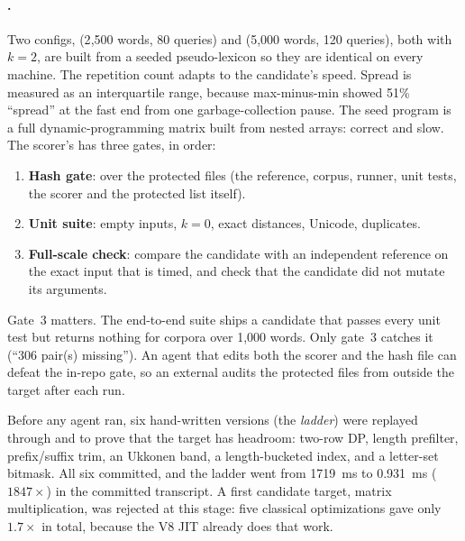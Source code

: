 \paragraph{.} Two configs,  (2{,}500 words, 80 queries) and
 (5{,}000 words, 120 queries), both with $k = 2$, are built from a seeded pseudo-lexicon
so they are identical on every machine. The repetition count adapts to the candidate's speed. Spread
is measured as an interquartile range, because max-minus-min showed 51\% ``spread'' at the fast end
from one garbage-collection pause. The seed program is a full dynamic-programming matrix built from
nested arrays: correct and slow. The scorer's  has three gates, in order:
\begin{enumerate}[leftmargin=*,itemsep=1pt]
  \item \textbf{Hash gate}:  over the protected files (the reference, corpus,
    runner, unit tests, the scorer and the protected list itself).
  \item \textbf{Unit suite}: empty inputs, $k=0$, exact distances, Unicode, duplicates.
  \item \textbf{Full-scale check}: compare the candidate with an independent reference on the
    exact input that is timed, and check that the candidate did not mutate its arguments.
\end{enumerate}
Gate~3 matters. The end-to-end suite ships a candidate that passes every unit test but returns
nothing for corpora over 1{,}000 words. Only gate~3 catches it (``306 pair(s) missing''). An agent
that edits both the scorer and the hash file can defeat the in-repo gate, so an external
 audits the protected files from outside the target after each run.

Before any agent ran, six hand-written versions (the \emph{ladder}) were replayed through
 and  to prove that the target has headroom: two-row DP, length prefilter,
prefix/suffix trim, an Ukkonen band, a length-bucketed index, and a letter-set bitmask. All six
committed, and the ladder went from \SI{1719}{ms} to \SI{0.931}{ms} ($1847\times$) in the committed
transcript. A first candidate target, matrix multiplication, was rejected at this stage: five
classical optimizations gave only $1.7\times$ in total, because the V8 JIT already does that work.

